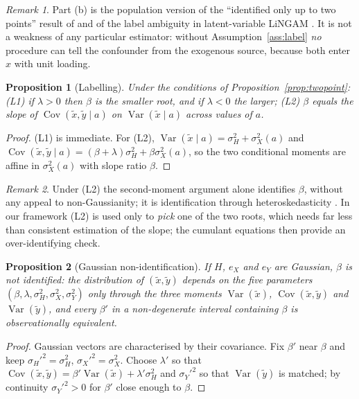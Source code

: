 \documentclass[11pt]{article}
\newtheorem{proposition}{Proposition}
\theoremstyle{definition}
\theoremstyle{remark}
\newtheorem{remark}{Remark}
\newcommand{\Var}{\operatorname{Var}}
\newcommand{\Cov}{\operatorname{Cov}}
\newcommand{\tx}{\tilde{x}}
\newcommand{\ty}{\tilde{y}}
\begin{document}
\begin{remark}
Part (b) is the population version of the ``identified only up to two points'' result of
\citet{delbianco2026} and of the label ambiguity in latent-variable LiNGAM
\citep{hoyer2008,tramontano2025}. It is not a weakness of any particular estimator: without
Assumption~\ref{ass:label} \emph{no} procedure can tell the confounder from the exogenous source,
because both enter $x$ with unit loading.
\end{remark}

\begin{proposition}[Labelling]\label{prop:label}
Under the conditions of Proposition~\ref{prop:twopoint}: (L1) if $\lambda>0$ then $\beta$ is the
smaller root, and if $\lambda<0$ the larger; (L2) $\beta$ equals the slope of
$\Cov(\tx,\ty\mid a)$ on $\Var(\tx\mid a)$ across values of $a$.
\end{proposition}

\begin{proof}
(L1) is immediate. For (L2), $\Var(\tx\mid a) = \sigma_H^2 + \sigma_X^2(a)$ and
$\Cov(\tx,\ty\mid a) = (\beta+\lambda)\sigma_H^2 + \beta\sigma_X^2(a)$, so the two conditional moments
are affine in $\sigma_X^2(a)$ with slope ratio $\beta$.
\end{proof}

\begin{remark}
Under (L2) the second-moment argument alone identifies $\beta$, without any appeal to
non-Gaussianity; it is identification through heteroskedasticity
\citep{rigobon2003,lewbel2012}. In our framework (L2) is used only to \emph{pick} one of the two
roots, which needs far less than consistent estimation of the slope; the cumulant equations then
provide an over-identifying check.
\end{remark}

\begin{proposition}[Gaussian non-identification]\label{prop:gauss}
If $H$, $e_X$ and $e_Y$ are Gaussian, $\beta$ is not identified: the distribution of $(\tx,\ty)$
depends on the five parameters $(\beta,\lambda,\sigma_H^2,\sigma_X^2,\sigma_Y^2)$ only through the
three moments $\Var(\tx)$, $\Cov(\tx,\ty)$ and $\Var(\ty)$, and every $\beta'$ in a non-degenerate
interval containing $\beta$ is observationally equivalent.
\end{proposition}

\begin{proof}
Gaussian vectors are characterised by their covariance. Fix $\beta'$ near $\beta$ and keep
$\sigma_H'^2 = \sigma_H^2$, $\sigma_X'^2=\sigma_X^2$. Choose $\lambda'$ so that
$\Cov(\tx,\ty) = \beta'\Var(\tx) + \lambda'\sigma_H^2$ and $\sigma_Y'^2$ so that $\Var(\ty)$ is
matched; by continuity $\sigma_Y'^2>0$ for $\beta'$ close enough to $\beta$.
\end{proof}
\end{document}
